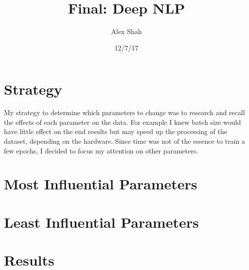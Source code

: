 \documentclass[10pt,a4paper]{article}
\begin{document}
\title{Final: Deep NLP}
\author{Alex Shah}
\date{12/7/17}

\maketitle

\section{Strategy}

My strategy to determine which parameters to change was to research and recall the effects of each parameter on the data. For example I knew batch size would have little effect on the end results but may speed up the processing of the dataset, depending on the hardware. Since time was not of the essence to train a few epochs, I decided to focus my attention on other parameters.


\section{Most Influential Parameters}



\section{Least Influential Parameters}



\section{Results}
\end{document}
